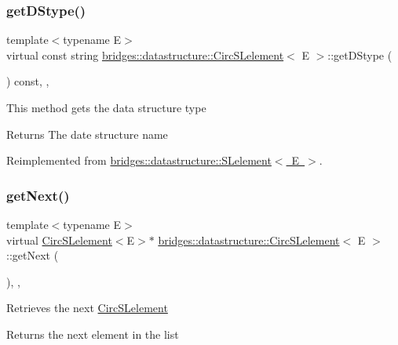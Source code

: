 \subsubsection{\texorpdfstring{get\+D\+Stype()}{getDStype()}}
{\footnotesize\ttfamily template$<$typename E$>$ \\
virtual const string \mbox{\hyperlink{classbridges_1_1datastructure_1_1_circ_s_lelement}{bridges\+::datastructure\+::\+Circ\+S\+Lelement}}$<$ E $>$\+::get\+D\+Stype (\begin{DoxyParamCaption}{ }\end{DoxyParamCaption}) const\hspace{0.3cm}{\ttfamily [inline]}, {\ttfamily [override]}, {\ttfamily [virtual]}}

This method gets the data structure type

\begin{DoxyReturn}{Returns}
The date structure name 
\end{DoxyReturn}


Reimplemented from \mbox{\hyperlink{classbridges_1_1datastructure_1_1_s_lelement_a602156aacacd73d1faa365d68d8af31b}{bridges\+::datastructure\+::\+S\+Lelement$<$ E $>$}}.

\mbox{\label{classbridges_1_1datastructure_1_1_circ_s_lelement_aff77056ace1361a35a09dc006eba34a3}} 
\subsubsection{\texorpdfstring{get\+Next()}{getNext()}}
{\footnotesize\ttfamily template$<$typename E$>$ \\
virtual \mbox{\hyperlink{classbridges_1_1datastructure_1_1_circ_s_lelement}{Circ\+S\+Lelement}}$<$E$>$$\ast$ \mbox{\hyperlink{classbridges_1_1datastructure_1_1_circ_s_lelement}{bridges\+::datastructure\+::\+Circ\+S\+Lelement}}$<$ E $>$\+::get\+Next (\begin{DoxyParamCaption}{ }\end{DoxyParamCaption})\hspace{0.3cm}{\ttfamily [inline]}, {\ttfamily [override]}, {\ttfamily [virtual]}}

Retrieves the next \mbox{\hyperlink{classbridges_1_1datastructure_1_1_circ_s_lelement}{Circ\+S\+Lelement}} \begin{DoxyReturn}{Returns}
the next element in the list 
\end{DoxyReturn}


